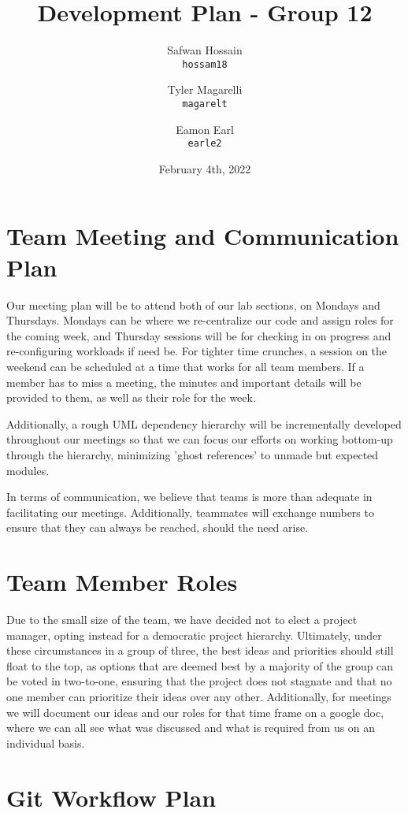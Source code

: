 \documentclass{article}
\title{Development Plan - Group 12}
\author{
  Safwan Hossain\\
  \texttt{hossam18}\\
  \and
  Tyler Magarelli\\
  \texttt{magarelt}\\
  \and
  Eamon Earl\\
  \texttt{earle2}
}
\date{February 4th, 2022}
\begin{document}
\maketitle

\section{Team Meeting and Communication Plan}

Our meeting plan will be to attend both of our lab sections, on Mondays and Thursdays. Mondays can be where we re-centralize our code and assign roles for the coming week, and Thursday sessions will be for checking in on progress and re-configuring workloads if need be. For tighter time crunches, a session on the weekend can be scheduled at a time that works for all team members. If a member has to miss a meeting, the minutes and important details will be provided to them, as well as their role for the week. 

Additionally, a rough UML dependency hierarchy will be incrementally developed throughout our meetings so that we can focus our efforts on working bottom-up through the hierarchy, minimizing 'ghost references' to unmade but expected modules.  

In terms of communication, we believe that teams is more than adequate in facilitating our meetings. Additionally, teammates will exchange numbers to ensure that they can always be reached, should the need arise.  


\section{Team Member Roles}

Due to the small size of the team, we have decided not to elect a project manager, opting instead for a democratic project hierarchy. Ultimately, under these circumstances in a group of three, the best ideas and priorities should still float to the top, as options that are deemed best by a majority of the group can be voted in two-to-one, ensuring that the project does not stagnate and that no one member can prioritize their ideas over any other. Additionally, for meetings we will document our ideas and our roles for that time frame on a google doc, where we can all see what was discussed and what is required from us on an individual basis.

\section{Git Workflow Plan}
\end{document}

